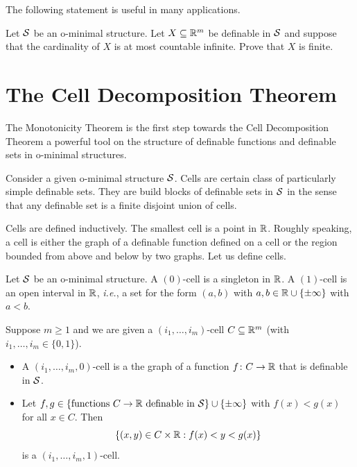 The following statement is useful in many applications. 

\begin{exercise}
  Let ${\mathcal S}$ be an o-minimal structure. 
  Let $X\subseteq{\mathbb{R}}^m$ be definable in ${\mathcal S}$ and suppose that the
  cardinality of $X$ is at most countable infinite. Prove that $X$ is
  finite. 
\end{exercise}


\section{The Cell Decomposition Theorem}

The Monotonicity Theorem is the first step towards the Cell
Decomposition Theorem a powerful tool on the structure of definable
functions and definable sets in o-minimal structures.

Consider a given o-minimal structure ${\mathcal S}$. Cells are certain class of
particularly simple definable sets. They are build blocks of definable
sets in ${\mathcal S}$ in the sense that any definable set is a finite disjoint
union of cells.

Cells are defined inductively. The smallest cell is a point in ${\mathbb{R}}$.
Roughly speaking, a cell is either the graph of a
definable function defined on a cell or the region bounded from above
and below by two graphs. 
Let us define cells.

\begin{definition}
  Let ${\mathcal S}$ be an o-minimal structure. 
  A $(0)$-cell is a singleton in ${\mathbb{R}}$. A $(1)$-cell is an open
  interval in ${\mathbb{R}}$, \textit{i.e.}, a set for the form $(a,b)$ with
  $a,b\in {\mathbb{R}}\cup\{\pm\infty\}$ with $a<b$.

  Suppose $m\ge 1$ and we are given a $(i_1,\ldots,i_m)$-cell
  $C\subseteq{\mathbb{R}}^m$
  (with $i_1,\ldots,i_m\in
  \{0,1\}$).  
  \begin{itemize}
  \item A $(i_1,\ldots,i_m,0)$-cell is a the graph of a function
    $f\colon C\rightarrow {\mathbb{R}}$ that is definable in ${\mathcal S}$.
  \item Let $f,g\in \{\text{functions }C\rightarrow {\mathbb{R}} \text{ definable
      in ${\mathcal S}$}\}\cup\{\pm\infty\}$  with $f(x) < g(x)$ for all $x\in C$. 
    Then
    \begin{equation*}
      \{(x,y)\in C\times {\mathbb{R}} : f(x) < y <
      g(x)  \}
    \end{equation*}
    is a $(i_1,\ldots,i_m,1)$-cell.
  \end{itemize}
\end{definition}

